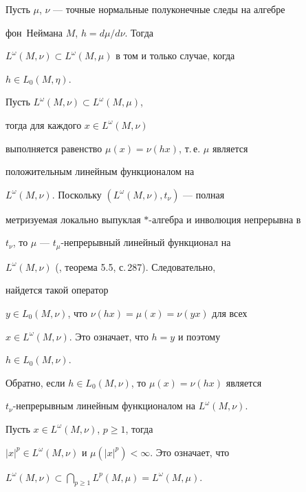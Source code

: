  


\begin{thm} 


Пусть $\mu$, $\nu$ --- точные нормальные полуконечные следы на алгебре 


фон~Неймана $M$, $h=d\mu/d\nu$. Тогда 


$L^\omega(M,\nu)\subset L^\omega(M,\mu)$ в том и только случае, когда 


$h\in L_0(M,\eta)$. 


\end{thm} 


 


\begin{pf} 


Пусть $L^\omega(M,\nu)\subset L^\omega(M,\mu)$, 


тогда для каждого $x\in L^\omega(M,\nu)$ 


выполняется равенство $\mu(x)=\nu(hx)$, т.\,е.{} $\mu$ является 


положительным линейным функционалом на 


$L^\omega(M,\nu)$. Поскольку $(L^\omega(M,\nu),t_\nu)$ --- полная 


метризуемая локально выпуклая $*$-алгебра и инволюция непрерывна в 


$t_\nu$, то $\mu$ --- $t_\mu$-непрерывный линейный функционал на 


$L^\omega(M,\nu)$ (\cite{9}, теорема 5.5, с.\,287). Следовательно, 


найдется такой оператор 


$y\in L_0(M,\nu)$, что $\nu(hx)=\mu(x)=\nu(yx)$ для всех 


$x\in L^\omega(M,\nu)$. Это означает, что $h=y$ и поэтому 


$h\in L_0(M,\nu)$. 


 


Обратно, если $h\in L_0(M,\nu)$, то $\mu(x)=\nu(hx)$ является 


$t_\nu$-непрерывным линейным функционалом на $L^\omega(M,\nu)$. 


Пусть $x\in L^\omega(M,\nu)$, $p\ge 1$, тогда 


$|x|^p\in L^\omega(M,\nu)$ и $\mu(|x|^p)<\infty$. Это означает, что 


$L^\omega(M,\nu)\subset\bigcap\limits_{p\ge 1}L^p(M,\mu)= 


L^\omega(M,\mu)$. 


\end{pf} 


